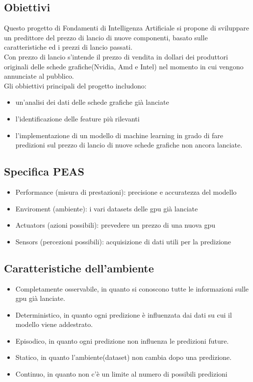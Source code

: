 \documentclass{article}
\begin{document}
    \subsection{Obiettivi}
    Questo progetto di Fondamenti di Intelligenza Artificiale si propone di sviluppare un predittore del prezzo di lancio di nuove componenti, basato sulle caratteristiche ed i prezzi di lancio passati.
    \\
    Con prezzo di lancio s'intende il prezzo di vendita in dollari dei produttori originali delle schede grafiche(Nvidia, Amd e Intel) nel momento in cui vengono annunciate al pubblico.
    \\
    Gli obbiettivi principali del progetto includono:
    \begin{itemize}
        \item un'analisi dei dati delle schede grafiche già lanciate 
        \item l'identificazione delle feature più rilevanti
        \item l'implementazione di un modello di machine learning in grado di fare predizioni sul prezzo di lancio di nuove schede grafiche non ancora lanciate.
    \end{itemize}
    
    \subsection{Specifica PEAS}
        \begin{itemize}
        \item Performance (misura di prestazioni): precisione e accuratezza del modello
        \item Enviroment (ambiente): i vari datasets delle gpu già lanciate
        \item Actuators (azioni possibili): prevedere un prezzo di una nuova gpu
        \item Sensors (percezioni possibili): acquisizione di dati utili per la predizione
        \end{itemize}
    \subsection{Caratteristiche dell'ambiente}
        \begin{itemize}
        \item Completamente osservabile, in quanto si conoscono tutte le informazioni sulle gpu già lanciate.
        \item Deterministico, in quanto ogni predizione è influenzata dai dati su cui il modello viene addestrato.
        \item Episodico, in quanto ogni predizione non influenza le predizioni future. 
        \item Statico, in quanto l'ambiente(dataset) non cambia dopo una predizione.
        \item Continuo, in quanto non c'è un limite al numero di possibili predizioni
        \end{itemize}
    
\end{document}
